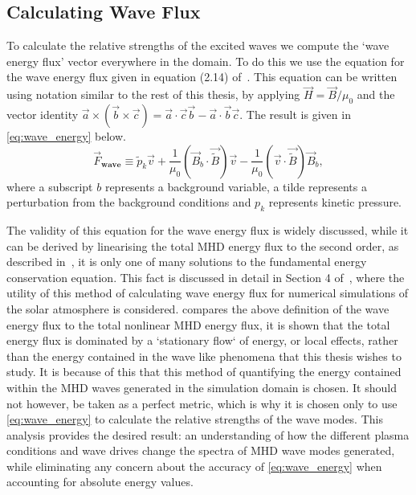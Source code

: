 \subsection{Calculating Wave Flux}\label{sec:waveflux}

To calculate the relative strengths of the excited waves we compute the `wave energy flux' vector everywhere in the domain.
To do this we use the equation for the wave energy flux given in equation (2.14) of~\cite{leroy1985}.
This equation can be written using notation similar to the rest of this thesis, by applying $\vec{H} = \vec{B}/\mu_0$ and the vector identity $\vec{a} \times (\vec{b} \times \vec{c}) = \vec{a} \cdot \vec{c}\vec{b} - \vec{a} \cdot \vec{b}\vec{c}$.
The result is given in \cref{eq:wave_energy} below.
\begin{equation}
\vec{F}_{\textbf{wave}} \equiv \widetilde{p}_k \vec{v} + \frac{1}{\mu_0} \left(\vec{B}_b \cdot \vec{\widetilde{B}}\right) \vec{v} - \frac{1}{\mu_0}\left(\vec{v} \cdot \vec{\widetilde{B}} \right) \vec{B}_b,
\label{eq:wave_energy}
\end{equation}
where a subscript $b$ represents a background variable, a tilde represents a perturbation from the background conditions and $p_k$ represents kinetic pressure.

The validity of this equation for the wave energy flux is widely discussed, %
while it can be derived by linearising the total MHD energy flux to the second order, as described in~\cite{leroy1985}, it is only one of many solutions to the fundamental energy conservation equation.
This fact is discussed in detail in Section 4 of~\cite{bogdan2003}, where the utility of this method of calculating wave energy flux for numerical simulations of the solar atmosphere is considered.
\cite{bogdan2003} compares the above definition of the wave energy flux to the total nonlinear MHD energy flux, it is shown that the total energy flux is dominated by a `stationary flow` of energy, or local effects, rather than the energy contained in the wave like phenomena that this thesis wishes to study.
It is because of this that this method of quantifying the energy contained within the MHD waves generated in the simulation domain is chosen.
It should not however, be taken as a perfect metric, which is why it is chosen only to use \cref{eq:wave_energy} to calculate the relative strengths of the wave modes.
This analysis provides the desired result: an understanding of how the different plasma conditions and wave drives change the spectra of MHD wave modes generated, while eliminating any concern about the accuracy of \cref{eq:wave_energy} when accounting for absolute energy values.



